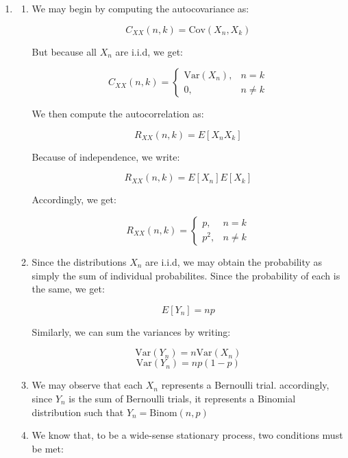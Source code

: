 \begin{enumerate}
\begin{enumerate}
    \end{enumerate}

  \item

    \begin{enumerate}

      \item We may begin by computing the autocovariance as:

        $$C_{XX}(n,k)=\text{Cov}(X_n,X_k)$$

        But because all $X_n$ are i.i.d, we get:

        $$\boxed{C_{XX}(n,k)=\left\{\begin{array}{ll}\text{Var}(X_n), & n=k\\0, & n\neq k\end{array}}$$

        We then compute the autocorrelation as:

        $$R_{XX}(n,k)=E[X_nX_k]$$

        Because of independence, we write:

        $$R_{XX}(n,k)=E[X_n]E[X_k]$$

        Accordingly, we get:

        $$\boxed{R_{XX}(n,k)=\left\{\begin{array}{ll} p, & n=k\\ p^2, & n\neq k\end{array}}$$

      \item Since the distributions $X_n$ are i.i.d, we may obtain the probability as simply the sum of individual probabilites. Since the probability of each is the same, we get:

        $$\boxed{E[Y_n]=np}$$

        Similarly, we can sum the variances by writing:

        $$\text{Var}(Y_n)=n\text{Var}(X_n)$$
        $$\boxed{\text{Var}(Y_n)=np(1-p)}$$

      \item We may observe that each $X_n$ represents a Bernoulli trial. accordingly, since $Y_n$ is the sum of Bernoulli trials, it represents a Binomial distribution such that $\boxed{Y_n=\text{Binom}(n,p)}$

      \item We know that, to be a wide-sense stationary process, two conditions must be met:

        \begin{enumerate}


\end{enumerate}
\end{enumerate}
\end{enumerate}
